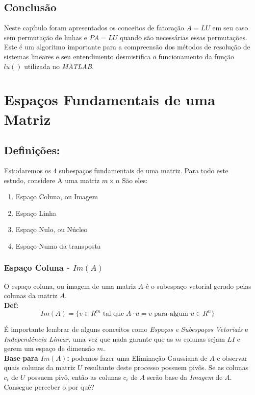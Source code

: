 \documentclass[12pt]{article}
\begin{document}
\subsection{Conclusão}
Neste capítulo foram apresentados os conceitos de fatoração $A=LU$ em seu caso sem permutação de linhas e $PA=LU$ quando são necessárias essas permutações. Este é um algoritmo importante para a compreensão dos métodos de resolução de sistemas lineares e seu entendimento desmistifica o funcionamento da função $lu()$ utilizada no \textit{MATLAB}.

	\section{Espaços Fundamentais de uma Matriz}
\subsection{Definições:}

Estudaremos os 4 subespaços fundamentais de uma matriz. Para todo este estudo, considere A uma matriz $m\times n$ São eles:
\begin{enumerate}
	\item Espaço Coluna, ou Imagem
	\item Espaço Linha
	\item Espaço Nulo, ou Núcleo
	\item Espaço Numo da transposta
\end{enumerate}

\subsubsection{Espaço Coluna - $Im(A)$}
O espaço coluna, ou imagem de uma matriz $A$ é o subespaço vetorial gerado pelas colunas da matriz $A$.\\

\textbf{Def:}
\begin{equation*}
	Im(A)=\{v \in R^m \mbox{ tal que } A\cdot u=v \mbox{ para algum }u\in R^n\}
\end{equation*}

É importante lembrar de alguns conceitos como \textit{Espaços e Subespaços Vetoriais} e \textit{Independência Linear}, uma vez que nada garante que as $m$ colunas sejam $LI$ e gerem um espaço de dimensão $m$.\\

\textbf{Base para $Im(A)$:} podemos fazer uma Eliminação Gaussiana de $A$ e observar quais colunas da matriz $U$ resultante deste processo possuem pivôs. Se as colunas $c_i$ de $U$ possuem pivô, então as colunas $c_i$ de $A$ serão base da \textit{Imagem} de $A$. Consegue perceber o por quê?\\
\end{document}
